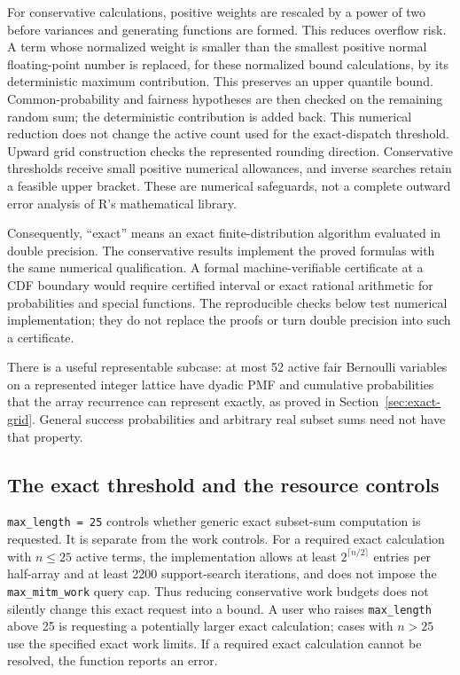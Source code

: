 \documentclass[11pt,letterpaper]{article}
\numberwithin{equation}{section}
\theoremstyle{definition}
\theoremstyle{remark}
\begin{document}
For conservative calculations, positive weights are rescaled by a power
of two before variances and generating functions are formed. This reduces
overflow risk. A term whose normalized weight is smaller than the smallest
positive normal floating-point number is replaced, for these normalized
bound calculations, by its deterministic maximum contribution. This
preserves an upper quantile bound. Common-probability and fairness
hypotheses are then checked on the remaining random sum; the deterministic
contribution is added back. This numerical reduction does not change the
active count used for the exact-dispatch threshold. Upward grid construction checks
the represented rounding direction. Conservative thresholds receive small
positive numerical allowances, and inverse searches retain a feasible
upper bracket. These are numerical safeguards, not a complete outward
error analysis of R's mathematical library.

Consequently, ``exact'' means an exact finite-distribution algorithm
evaluated in double precision. The conservative results implement the
proved formulas with the same numerical qualification. A formal
machine-verifiable certificate at a CDF boundary would require certified
interval or exact rational arithmetic for probabilities and special
functions. The reproducible checks below test numerical implementation;
they do not replace the proofs or turn double precision into such a
certificate.

There is a useful representable subcase: at most 52 active fair Bernoulli
variables on a represented integer lattice have dyadic PMF and cumulative
probabilities that the array recurrence can represent exactly, as proved
in Section~\ref{sec:exact-grid}. General success probabilities and arbitrary
real subset sums need not have that property.

\subsection{The exact threshold and the resource controls}

\texttt{max\_length = 25} controls whether generic exact subset-sum
computation is requested. It is separate from the work controls. For a
required exact calculation with $n\le25$ active terms, the implementation
allows at least $2^{\lceil n/2\rceil}$ entries per half-array and at least
2200 support-search iterations, and does not impose the
\texttt{max\_mitm\_work} query cap. Thus reducing conservative work budgets
does not silently change this exact request into a bound. A user who
raises \texttt{max\_length} above 25 is requesting a potentially larger
exact calculation; cases with $n>25$ use the specified exact work limits.
If a required exact calculation cannot be resolved, the function reports
an error.
\end{document}
